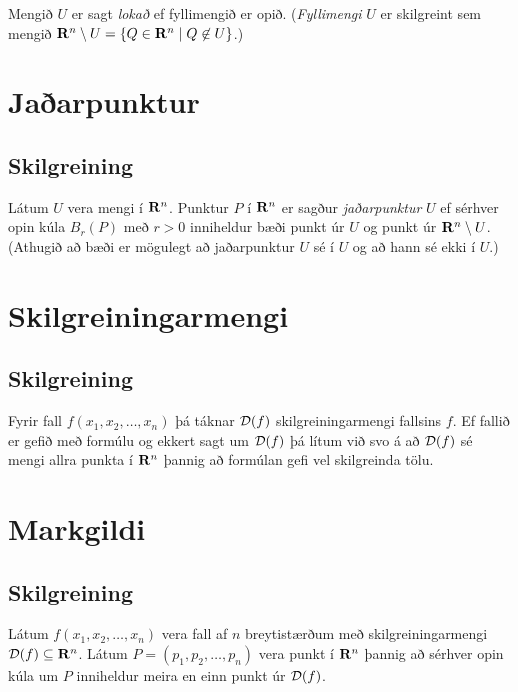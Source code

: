 \documentclass[a4paper,10pt,icelandic]{sphinxmanual}
\begin{document}
Mengið \(U\) er sagt \emph{lokað} ef fyllimengið er opið. (\emph{Fyllimengi}
\(U\) er skilgreint sem mengið
\(\mbox{${\bf R}^n$}\setminus U=\{Q\in \mbox{${\bf R}^n$}\mid Q\mbox{$\;\not\in\;$}U\}\).)


\section{Jaðarpunktur}
\label{Kafli2:jaarpunktur}

\subsection{Skilgreining}
\label{Kafli2:id5}\label{Kafli2:index-5}
Látum \(U\) vera mengi í \(\mbox{${\bf R}^n$}\). Punktur
\(P\) í \(\mbox{${\bf R}^n$}\) er sagður \emph{jaðarpunktur}
\(U\) ef sérhver opin kúla \(B_r(P)\) með \(r>0\) inniheldur
bæði punkt úr \(U\) og punkt úr
\(\mbox{${\bf R}^n$}\setminus U\). (Athugið að bæði er mögulegt að
jaðarpunktur \(U\) sé í \(U\) og að hann sé ekki í \(U\).)


\section{Skilgreiningarmengi}
\label{Kafli2:skilgreiningarmengi}

\subsection{Skilgreining}
\label{Kafli2:id6}\label{Kafli2:index-6}
Fyrir fall \(f(x_1,x_2,\ldots,x_n)\) þá táknar \({\cal D}(f)\)
skilgreiningarmengi fallsins \(f\). Ef fallið er gefið með formúlu
og ekkert sagt um \({\cal D}(f)\) þá lítum við svo á að
\({\cal D}(f)\) sé mengi allra punkta í \(\mbox{${\bf R}^n$}\)
þannig að formúlan gefi vel skilgreinda tölu.


\section{Markgildi}
\label{Kafli2:index-7}\label{Kafli2:markgildi}

\subsection{Skilgreining}
\label{Kafli2:id7}
Látum \(f(x_1,x_2,\ldots,x_n)\) vera fall af \(n\) breytistærðum
með skilgreiningarmengi \({\cal D}(f)\subseteq \mbox{${\bf R}^n$}\).
Látum \(P=(p_1,p_2,\ldots,p_n)\) vera punkt í
\(\mbox{${\bf R}^n$}\) þannig að sérhver opin kúla um \(P\)
inniheldur meira en einn punkt úr \({\cal D}(f)\).
\end{document}
